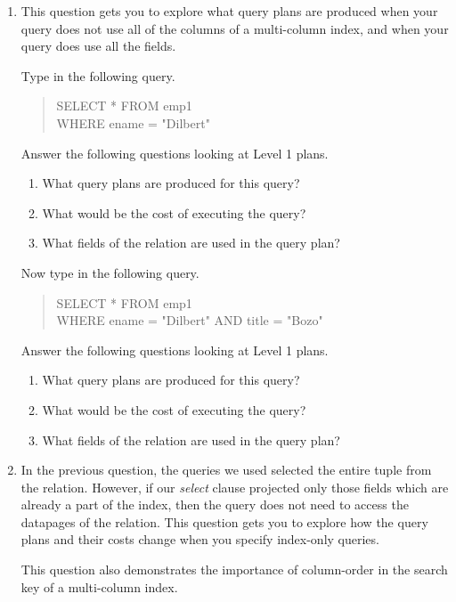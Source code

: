 \begin{enumerate}
\item
This question gets you to explore what query plans are produced when
your query does not use all of the columns of a multi-column index, and when
your query does use all the fields.

Type in the following query.  
\begin{quote}
        SELECT * FROM emp1\\
        WHERE ename = "Dilbert"
\end{quote}

Answer the following questions looking at Level 1 plans.
\begin{enumerate}
\item
What query plans are produced for this query?
\item
What would be the cost of executing the query?
\item
What fields of the relation are used in the query plan?
\end{enumerate}

Now type in the following query.
\begin{quote}
        SELECT * FROM emp1\\
        WHERE ename = "Dilbert" AND title = "Bozo"
\end{quote}

Answer the following questions looking at Level 1 plans.
\begin{enumerate}
\item
What query plans are produced for this query?
\item
What would be the cost of executing the query?
\item
What fields of the relation are used in the query plan?
\end{enumerate}


\item

In the previous question, the queries we used selected the entire tuple
from the relation.  However, if our {\em select} clause projected only
those fields which are already a part of the index, then the query does
not need to access the datapages of the relation.  This question gets you
to explore how the query plans and their costs change when you specify
index-only queries.

This question also demonstrates the importance of column-order in the
search key of a multi-column index.


\end{enumerate}
